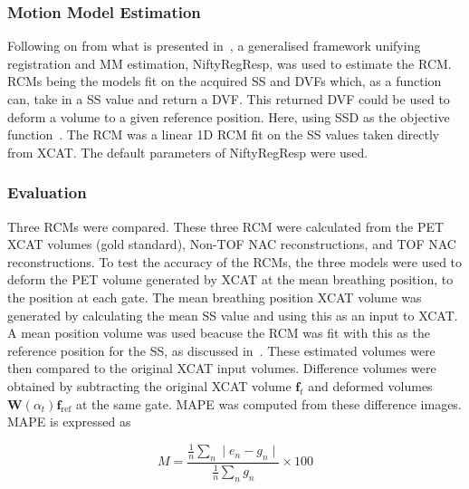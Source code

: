             \subsubsection{Motion Model Estimation} \label{sec:impact_of_tof_on_respiratory_motion_model_estimation_using_pre_gated_no_intra_cycle_motion_nac_pet_methods_motion_model_estimation}
                Following on from what is presented in~, a generalised framework unifying registration and \gls{MM} estimation, NiftyRegResp, was used to estimate the \gls{RCM}. \glspl{RCM} being the models fit on the acquired \gls{SS} and \glspl{DVF} which, as a function can, take in a \gls{SS} value and return a \gls{DVF}. This returned \gls{DVF} could be used to deform a volume to a given reference position. Here, using \gls{SSD} as the objective function~\parencite{McClelland2017}. The \gls{RCM} was a linear \gls{1D} \gls{RCM} fit on the \gls{SS} values taken directly from \gls{XCAT}. The default parameters of NiftyRegResp were used.
                
            \subsubsection{Evaluation} \label{sec:impact_of_tof_on_respiratory_motion_model_estimation_using_pre_gated_no_intra_cycle_motion_nac_pet_methods_evaluation}
                Three \glspl{RCM} were compared. These three \gls{RCM} were calculated from the \gls{PET} \gls{XCAT} volumes (gold standard), \gls{Non-TOF} \gls{NAC} reconstructions, and \gls{TOF} \gls{NAC} reconstructions. To test the accuracy of the \glspl{RCM}, the three models were used to deform the \gls{PET} volume generated by \gls{XCAT} at the mean breathing position, to the position at each gate. The mean breathing position \gls{XCAT} volume was generated by calculating the mean \gls{SS} value and using this as an input to \gls{XCAT}. A mean position volume was used beacuse the \gls{RCM} was fit with this as the reference position for the \gls{SS}, as discussed in~. These estimated volumes were then compared to the original \gls{XCAT} input volumes. Difference volumes were obtained by subtracting the original \gls{XCAT} volume $\mathbf{f}_t$ and deformed volumes $\mathbf{W}(\alpha_t) \mathbf{f}_\mathrm{ref}$ at the same gate. \gls{MAPE} was computed from these difference images. \gls{MAPE} is expressed as
                
                \begin{equation} \label{eq:impact_of_tof_on_respiratory_motion_model_estimation_using_pre_gated_no_intra_cycle_motion_nac_pet_methods_mape}
                   M = \frac{\frac{1}{n}\sum_{n}\mid e_n - g_n \mid}{\frac{1}{n}\sum_{n}g_n} \times 100
                \end{equation}
                
